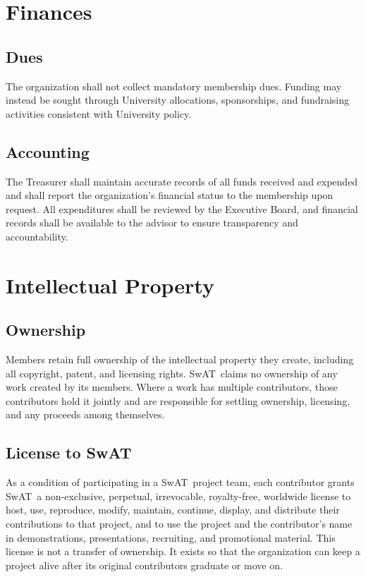 \documentclass[12pt,letterpaper]{article} %
\newcommand{\orgshort}{SwAT}
\begin{document}
\section{Finances}\label{art:finances} %
\subsection{Dues}\label{sec:dues}
The organization shall not collect mandatory membership dues. Funding may instead be
sought through University allocations, sponsorships, and fundraising activities consistent
with University policy.
\subsection{Accounting}\label{sec:accounting}
The Treasurer shall maintain accurate records of all funds received and expended and shall
report the organization's financial status to the membership upon request. All expenditures
shall be reviewed by the Executive Board, and financial records shall be available to the
advisor to ensure transparency and accountability.

\section{Intellectual Property}\label{art:ip} %
\subsection{Ownership}\label{sec:ip-ownership}
Members retain full ownership of the intellectual property they create, including all
copyright, patent, and licensing rights. \orgshort\ claims no ownership of any work created by
its members. Where a work has multiple contributors, those contributors hold it jointly and
are responsible for settling ownership, licensing, and any proceeds among themselves.
\subsection{License to \orgshort}\label{sec:ip-license}
As a condition of participating in a \orgshort\ project team, each contributor grants
\orgshort\ a non-exclusive, perpetual, irrevocable, royalty-free, worldwide license to host,
use, reproduce, modify, maintain, continue, display, and distribute their contributions to
that project, and to use the project and the contributor's name in demonstrations,
presentations, recruiting, and promotional material. This license is not a transfer of
ownership. It exists so that the organization can keep a project alive after its original
contributors graduate or move on.
\end{document}
